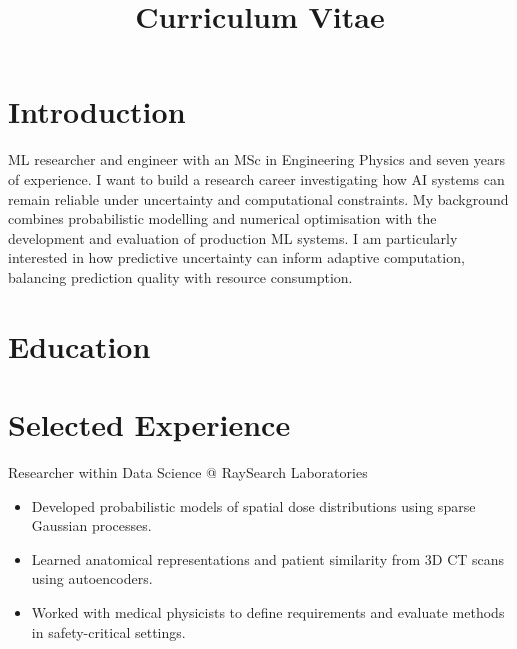 \documentclass[11pt,a4paper]{moderncv}
\title{Curriculum Vitae}
\begin{document}
\makecvtitle

\section*{Introduction}
ML researcher and engineer with an MSc in Engineering Physics and seven years of experience. I want to build a research career investigating how AI systems can remain reliable under uncertainty and computational constraints. My background combines probabilistic modelling and numerical optimisation with the development and evaluation of production ML systems. I am particularly interested in how predictive uncertainty can inform adaptive computation, balancing prediction quality with resource consumption.

\section{Education}





\section{Selected Experience}

\large{Researcher within Data Science @ RaySearch Laboratories}
\normalsize
\begin{itemize}
    \item Developed probabilistic models of spatial dose distributions using sparse Gaussian processes.
    \item Learned anatomical representations and patient similarity from 3D CT scans using autoencoders.
    \item Worked with medical physicists to define requirements and evaluate methods in safety-critical settings.
\end{itemize}
\end{document}
